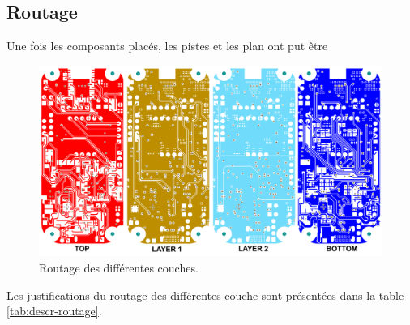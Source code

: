 \subsection{Routage} \label{ssec:routage}
Une fois les composants placés, les pistes et les plan ont put être 

\begin{figure}[!h]
	\centering
	\includegraphics[width=.9\linewidth]{../figures/dev-pcb/Couches-layout}
	\caption{Routage des différentes couches.}
	\label{fig:couches-layout}
\end{figure}

Les justifications du routage des différentes couche sont présentées dans la table \ref{tab:descr-routage}.

